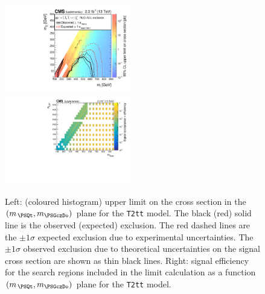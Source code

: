 \clearpage
\begin{figure}[!h]
  \begin{center}
    \includegraphics[width=0.49\textwidth]{GenMetXSEC_aux} \, %
    \includegraphics[width=0.49\textwidth]{T2tt_merging_4_cats_aux} \,     
  \end{center}
  \caption{Left: (coloured histogram) upper limit on the cross section in the $(m_{\,\PSQt}, m_{\PSGczDo})$ plane for the \texttt{T2tt} model. 
  The black (red) solid line is the observed (expected) exclusion. The red dashed lines are the $\pm1\sigma$ expected exclusion due to experimental uncertainties. 
  The $\pm1\sigma$ observed exclusion due to theoretical uncertainties on the signal cross section are shown as thin black lines. 
  Right: signal efficiency for the search regions included in the limit calculation as a function $(m_{\,\PSQt}, m_{\PSGczDo})$ plane for the \texttt{T2tt} model. 
  \label{fig:T2tt_excl}}
\end{figure}


